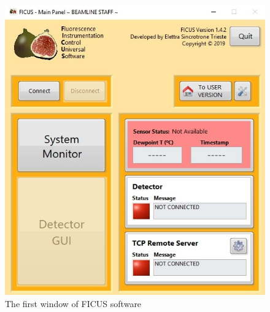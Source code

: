 \documentclass[a4paper,12pt,oneside,pdflatex,italian,final,twocolumn]{article}
\begin{document}
        \begin{figure}[h]
        \centering
        \includegraphics[scale=0.5]{Cattura66.jpg} \quad %
        \caption{The first window of FICUS software}\label{fig:fig31}
        \end{figure}
\end{document}
